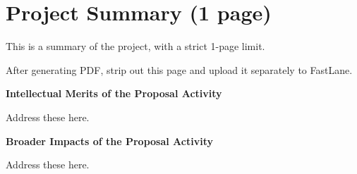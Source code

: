 \section*{Project Summary {\small (1 page)}}
%
This is a summary of the project, with a strict 1-page limit.

After generating PDF, strip out this page and upload it
separately to FastLane.

{\bf Intellectual Merits of the Proposal Activity} 

Address these here.

{\bf Broader Impacts of the Proposal Activity} 

Address these here.


